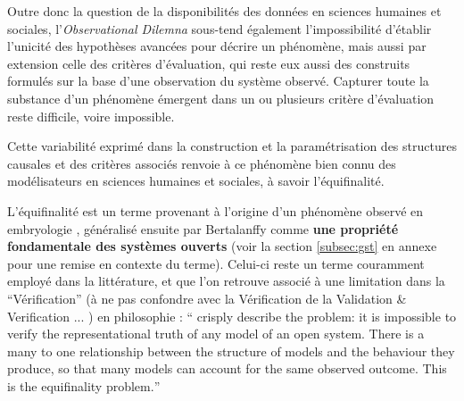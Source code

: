 Outre donc la question de la disponibilités des données en sciences humaines et sociales, l'\textit{Observational Dilemna} sous-tend également l'impossibilité d'établir l'unicité des hypothèses avancées pour décrire un phénomène, mais aussi par extension celle des critères d'évaluation, qui reste eux aussi des construits formulés sur la base d'une observation du système observé. Capturer toute la substance d'un phénomène émergent dans un ou plusieurs critère d'évaluation reste difficile, voire impossible.

Cette variabilité exprimé dans la construction et la paramétrisation des structures causales et des critères associés renvoie à ce phénomène bien connu des modélisateurs en sciences humaines et sociales, à savoir l'équifinalité.

L'équifinalité est un terme provenant à l'origine d'un phénomène observé en embryologie , généralisé ensuite par Bertalanffy comme \textbf{une propriété fondamentale des systèmes ouverts} (voir la section \ref{subsec:gst} en annexe pour une remise en contexte du terme). Celui-ci reste un terme couramment employé dans la littérature, et que l'on retrouve associé à une limitation dans la \enquote{Vérification} (à ne pas confondre avec la Vérification de la Validation \& Verification ... \autocite{David2009})  en philosophie : \foreignquote{english}{\textcite{Oreske1994} crisply describe the problem: it is impossible to verify the representational truth of any model of an open system. There is a many to one relationship between the structure of models and the behaviour they produce, so that many models can account for the same observed outcome. This is the equifinality problem.} \autocite{OSullivan2004}